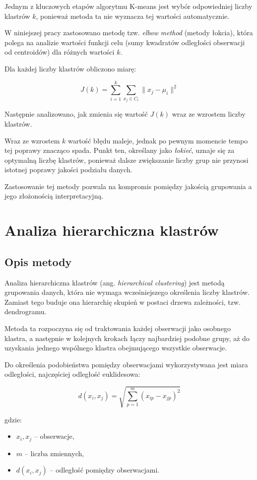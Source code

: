 \documentclass{report}
\begin{document}
Jednym z kluczowych etapów algorytmu K-means jest wybór odpowiedniej liczby klastrów \(k\), ponieważ metoda ta nie wyznacza tej wartości automatycznie.

W niniejszej pracy zastosowano metodę tzw. \textit{elbow method} (metody łokcia), która polega na analizie wartości funkcji celu (sumy kwadratów odległości obserwacji od centroidów) dla różnych wartości \(k\).

Dla każdej liczby klastrów obliczono miarę:

\[
J(k) = \sum_{i=1}^{k} \sum_{x_j \in C_i} \|x_j - \mu_i\|^2
\]

Następnie analizowano, jak zmienia się wartość \(J(k)\) wraz ze wzrostem liczby klastrów.

Wraz ze wzrostem \(k\) wartość błędu maleje, jednak po pewnym momencie tempo tej poprawy znacząco spada. Punkt ten, określany jako \textit{łokieć}, uznaje się za optymalną liczbę klastrów, ponieważ dalsze zwiększanie liczby grup nie przynosi istotnej poprawy jakości podziału danych.

Zastosowanie tej metody pozwala na kompromis pomiędzy jakością grupowania a jego złożonością interpretacyjną.

\section{Analiza hierarchiczna klastrów}

\subsection{Opis metody}

Analiza hierarchiczna klastrów (ang. \textit{hierarchical clustering}) jest metodą grupowania danych, która nie wymaga wcześniejszego określenia liczby klastrów. Zamiast tego buduje ona hierarchię skupień w postaci drzewa zależności, tzw. dendrogramu.

Metoda ta rozpoczyna się od traktowania każdej obserwacji jako osobnego klastra, a następnie w kolejnych krokach łączy najbardziej podobne grupy, aż do uzyskania jednego wspólnego klastra obejmującego wszystkie obserwacje.

Do określenia podobieństwa pomiędzy obserwacjami wykorzystywana jest miara odległości, najczęściej odległość euklidesowa:

\[
d(x_i, x_j) = \sqrt{\sum_{p=1}^{m} (x_{ip} - x_{jp})^2}
\]

gdzie:
\begin{itemize}
    \item \(x_i, x_j\) -- obserwacje,
    \item \(m\) -- liczba zmiennych,
    \item \(d(x_i, x_j)\) -- odległość pomiędzy obserwacjami.
\end{itemize}
\end{document}

